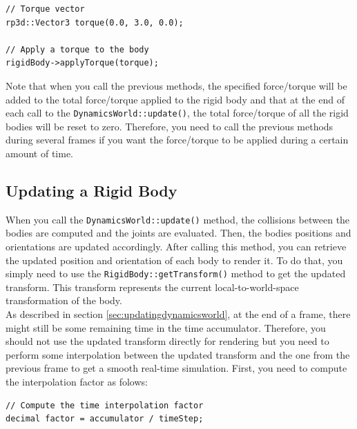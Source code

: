 \documentclass[a4paper,12pt]{article}
\begin{document}
    \begin{lstlisting}
// Torque vector
rp3d::Vector3 torque(0.0, 3.0, 0.0);

// Apply a torque to the body
rigidBody->applyTorque(torque);
  \end{lstlisting}

    \vspace{0.6cm}

    Note that when you call the previous methods, the specified force/torque will be added to the total force/torque applied to the rigid body and that at the end of each call to the
    \texttt{DynamicsWorld::update()}, the total force/torque of all the rigid bodies will be reset to zero. Therefore, you need to call the previous methods during several frames
    if you want the force/torque to be applied during a certain amount of time.

    \subsection{Updating a Rigid Body}

    When you call the \texttt{DynamicsWorld::update()} method, the collisions between the bodies are computed and the joints are evaluated. Then, the bodies positions
    and orientations are updated accordingly. After calling this method, you can retrieve the updated position and orientation of each body to render it. To do that, you simply need to use the
    \texttt{RigidBody::getTransform()} method to get the updated transform. This transform represents the current local-to-world-space transformation
    of the body. \\

    As described in section \ref{sec:updatingdynamicsworld}, at the end of a frame, there might still be some remaining time in the time accumulator. Therefore, you should not use the updated
    transform directly for rendering but you need to perform some interpolation between the updated transform and the one from the previous frame to get a smooth real-time simulation.
    First, you need to compute the interpolation factor as folows: \\

    \begin{lstlisting}
// Compute the time interpolation factor
decimal factor = accumulator / timeStep;
    \end{lstlisting}

    \vspace{0.6cm}
\end{document}
